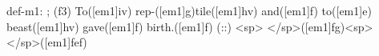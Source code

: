 def-m1: \grealign;
(f3) To([em1]iv) rep-([em1]g)tile([em1]hv) and([em1]f) to([em1]e) beast([em1]hv) gave([em1]f) birth.([em1]f) (::) <sp> </sp>([em1]fg)<sp>   </sp>([em1]fef)